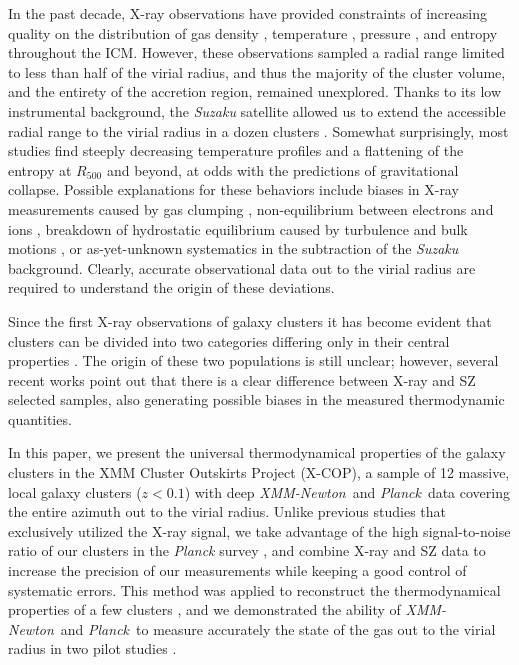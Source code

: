 \documentclass[traditabstract   ]{aa} %
\newcommand{\xmm}{{\it XMM-Newton}}
\newcommand{\planck}{{\it Planck}}
\begin{document}
In the past decade, X-ray observations have provided constraints of increasing quality on the distribution of gas density \citep{croston+06,eckert12}, temperature \citep{degrandi2002,vikhlini+06,pratt07,lm08}, pressure \citep{arnaud+10}, and entropy \citep{cavagnolo+09,pratt+10} throughout the ICM. However, these observations sampled a radial range limited to less than half of the virial radius, and thus the majority of the cluster volume, and the entirety of the accretion region, remained unexplored. Thanks to its low instrumental background, the \emph{Suzaku} satellite allowed us to extend the accessible radial range to the virial radius in a dozen clusters \citep[e.g.,][]{reiprich13,akamatsu11,simi11,simi17,walker12a,walker12b,urban14}. Somewhat surprisingly, most studies find steeply decreasing temperature profiles and a flattening of the entropy at $R_{500}$ and beyond, at odds with the predictions of gravitational collapse. Possible explanations for these behaviors  include biases in X-ray measurements caused by gas clumping \citep{nagai11,simi11,vazza13,roncarelli+13}, non-equilibrium between electrons and ions \citep{hoshino10,avestruz15}, breakdown of hydrostatic equilibrium caused by turbulence and bulk motions \citep{lapi10,okabe14,avestruz15,khatri16}, or as-yet-unknown systematics in the subtraction of the \emph{Suzaku} background.  Clearly, accurate observational data out to the virial radius are required to understand the origin of these deviations.

{
Since the first X-ray observations of galaxy clusters it has become evident that clusters can be divided into two categories differing only in their central properties \citep{Jones+84}.
The origin of these two populations is still unclear;  however, several recent works \citep{rossetti17, lovisari17, andrade-santos17}  point out that there is a clear difference between X-ray and SZ selected samples, also generating possible biases  in the measured thermodynamic quantities.
}


In this paper, we present the universal thermodynamical properties of the galaxy clusters in the XMM Cluster Outskirts Project (X-COP), a sample of 12 massive, local galaxy clusters ($z < 0.1$) with deep \xmm\ and \planck\ data covering the entire azimuth out to the virial radius. Unlike previous studies that  exclusively utilized the X-ray signal, we take advantage of the high signal-to-noise ratio of our clusters in the \emph{Planck} survey \citep{psz1}, and combine X-ray and SZ data to increase the precision of our measurements while keeping a good control of systematic errors. This method was  applied to reconstruct the thermodynamical properties of a few clusters \citep{basu10,eckert13a,adam15,ruppin17}, and we demonstrated the ability of \xmm\ and \planck\ to measure accurately the state of the gas out to the virial radius in two pilot studies \citep{tchernin16, ghirardini18}. 
\end{document}
